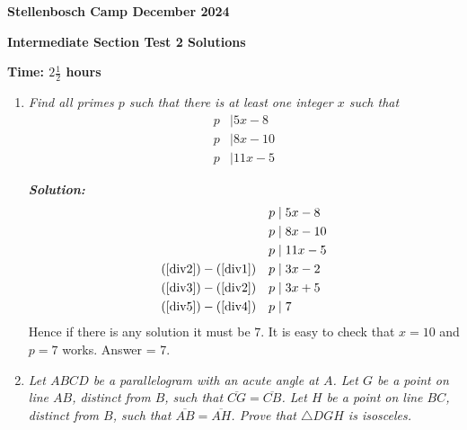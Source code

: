 \documentclass[12pt]{article}
\newcommand{\sol}{\textbf{\textit{Solution: }}}
\begin{document}
\begin{center} \large
\textbf{Stellenbosch Camp December 2024}

\textbf{Intermediate Section Test 2 Solutions}

\textbf{Time: \(2 \frac{1}{2}\) hours}
\end{center}
\begin{enumerate}[topsep=2\bigskipamount,itemsep=\bigskipamount]
\item \textit{Find all primes $p$
such that there is at least one integer $x$
such that
\begin{align*}
p &\mid5x-8
\\ p &\mid8x-10
\\ p &\mid11x-5
\end{align*}}

\sol
\begin{align}
&&p &\mid5x-8\label{div1}\\
&&p &\mid8x-10\label{div2}\\
&&p &\mid11x-5\label{div3}\\
(\ref{div2})-(\ref{div1}) && p &\mid3x-2\label{div4}\\
(\ref{div3})-(\ref{div2}) && p &\mid3x+5\label{div5}\\
(\ref{div5})-(\ref{div4}) && p &\mid7
\end{align}
Hence if there is any solution it must be $7$.
It is easy to check that $x=10$ and $p=7$ works.
Answer = 7.

\item \textit{Let $ABCD$ be a parallelogram with an acute angle at $A$. Let $G$ be a point on line $AB$, distinct from $B$, such that $\overline{CG}=\overline{CB}$. Let $H$ be a point on line $BC$, distinct from $B$, such that $\overline{AB}=\overline{AH}$. Prove that $\triangle DGH$ is isosceles.  }


\end{enumerate}
\end{document}

